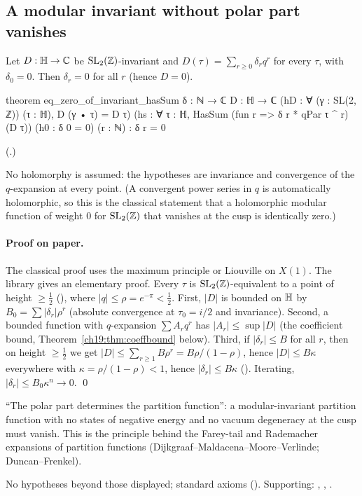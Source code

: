 \subsection{A modular invariant without polar part vanishes}

\begin{theorem}\label{ch19:thm:vanish}
Let $D:\mathbb{H}\to{\mathbb{C}}$ be $\mathrm{SL}_2(\mathbb{Z})$-invariant and $D(\tau)=\sum_{r\ge0}\delta_rq^r$ for every $\tau$, with
$\delta_0=0$.  Then $\delta_r=0$ for all $r$ (hence $D=0$).
\end{theorem}
\begin{leancode}
theorem eq_zero_of_invariant_hasSum {δ : ℕ → ℂ} {D : ℍ → ℂ}
    (hD : ∀ (γ : SL(2, ℤ)) (τ : ℍ), D (γ • τ) = D τ)
    (hs : ∀ τ : ℍ, HasSum (fun r => δ r * qPar τ ^ r) (D τ)) (h0 : δ 0 = 0) (r : ℕ) :
    δ r = 0
\end{leancode}
(.)
\begin{dictionary}
No holomorphy is assumed: the hypotheses are invariance and convergence of the $q$-expansion at every point.  (A
convergent power series in $q$ is automatically holomorphic, so this is the classical statement that a holomorphic
modular function of weight $0$ for $\mathrm{SL}_2(\mathbb{Z})$ that vanishes at the cusp is identically zero.)
\end{dictionary}
\paragraph{Proof on paper.}  The classical proof uses the maximum principle or Liouville on $X(1)$.  The library gives an
elementary proof.  Every $\tau$ is $\mathrm{SL}_2(\mathbb{Z})$-equivalent to a point of height $\ge\frac12$
(), where $|q|\le\rho=e^{-\pi}<\frac12$.  First, $|D|$ is bounded on $\mathbb{H}$ by
$B_0=\sum|\delta_r|\rho^r$ (absolute convergence at $\tau_0=i/2$ and invariance).  Second, a bounded function with
$q$-expansion $\sum A_rq^r$ has $|A_r|\le\sup|D|$ (the coefficient bound, Theorem~\ref{ch19:thm:coeffbound} below).  Third,
if $|\delta_r|\le B$ for all $r$, then on height $\ge\frac12$ we get $|D|\le\sum_{r\ge1}B\rho^r=B\rho/(1-\rho)$, hence
$|D|\le B\kappa$ everywhere with $\kappa=\rho/(1-\rho)<1$, hence $|\delta_r|\le B\kappa$ ().
Iterating, $|\delta_r|\le B_0\kappa^n\to0$. \qed
\begin{physics}
``The polar part determines the partition function'': a modular-invariant partition function with no states of negative
energy and no vacuum degeneracy at the cusp must vanish.  This is the principle behind the Farey-tail and Rademacher
expansions of partition functions (Dijkgraaf--Maldacena--Moore--Verlinde; Duncan--Frenkel).
\end{physics}
\begin{status}
No hypotheses beyond those displayed; standard axioms ().  Supporting:
, , .
\end{status}


